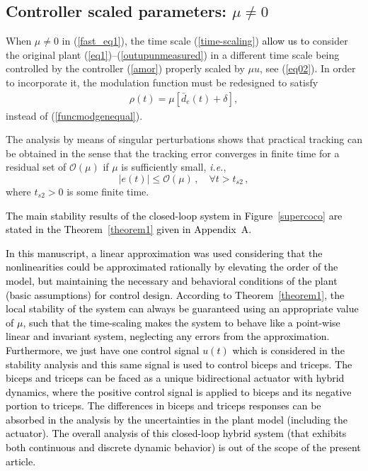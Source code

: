 \documentclass[review]{elsarticle}
\begin{document}
\subsection{Controller scaled parameters: $\mu \neq 0$}

When $\mu\neq 0$ in (\ref{fast_eq1}), the time scale (\ref{time-scaling}) \textcolor{black}{allow us to} consider the original plant
(\ref{eq1})--(\ref{outupunmeasured}) in a different time scale being controlled by the controller (\ref{amor})
properly scaled by $\mu u$, see (\ref{eq02}). In order to incorporate it, the modulation function must be redesigned to satisfy
%
%
\begin{align}
\rho(t)=\mu[\bar{d}_e(t)+\delta], \label{fast_funcmodgen}
\end{align}
%
instead of (\ref{funcmodgenequal}).

The analysis by means of singular perturbations shows that practical tracking can be obtained in the sense that the tracking error converges in finite time for a residual set of $\mathcal{O}(\mu)$ if $\mu$ is sufficiently small, \textit{i.e.},
%
\begin{equation}
|e(t)|\!\leq\!\mathcal{O}(\mu)\,, \quad \forall t>t_{s2}\,,
\end{equation}
%
where $t_{s2}>0$ is some finite time.
%


\textcolor{black}{The main stability results of the closed-loop system in Figure~\ref{supercoco} are stated in the Theorem~\ref{theorem1} given in Appendix~A.} 


 \textcolor{black}{In this manuscript, a linear approximation was used considering that the nonlinearities could be approximated rationally by elevating the order of the model, but maintaining the necessary and behavioral conditions of the plant (basic assumptions) for control design. According to Theorem~\ref{theorem1}, the local stability of the system can always be guaranteed using an appropriate value of $\mu$, such that the time-scaling makes the system to behave like a point-wise linear and invariant system, neglecting any errors from the approximation.}  \textcolor{black}{Furthermore, we just have one control signal $u(t)$ which is considered in the stability analysis and this same signal is used to control biceps and triceps. The biceps and triceps can be faced as a unique bidirectional actuator with hybrid dynamics, where the positive control signal is applied to biceps and its negative portion to triceps. The differences in biceps and triceps responses can be absorbed in the analysis by the uncertainties in the plant model (including the actuator). The overall analysis of this closed-loop hybrid system (that exhibits both continuous and discrete dynamic behavior) is out of the scope of the present article.}
\end{document}
